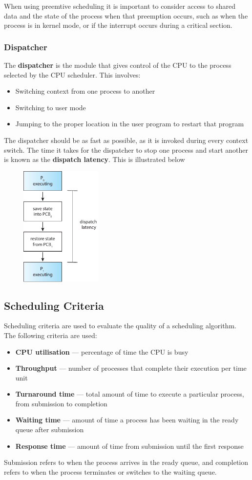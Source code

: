\documentclass{article}
\begin{document}
When using preemtive scheduling it is important to consider access to
shared data and the state of the process when that preemption occurs,
such as when the process is in kernel mode, or if the interrupt occurs
during a critical section.
\subsubsection{Dispatcher}
The \textbf{dispatcher} is the module that gives control of the CPU to
the process selected by the CPU scheduler. This involves:
\begin{itemize}
    \item Switching context from one process to another
    \item Switching to user mode
    \item Jumping to the proper location in the user program to restart
          that program
\end{itemize}
The dispatcher should be as fast as possible, as it is invoked during
every context switch. The time it takes for the dispatcher to stop one
process and start another is known as the \textbf{dispatch latency}.
This is illustrated below
\begin{figure}[H]
    \centering
    \includegraphics[height = 6cm]{figures/dispatcher.pdf}
\end{figure}
\subsection{Scheduling Criteria}
Scheduling criteria are used to evaluate the quality of a scheduling
algorithm. The following criteria are used:
\begin{itemize}
    \item \textbf{CPU utilisation} --- percentage of time the CPU is
          busy
    \item \textbf{Throughput} --- number of processes that complete
          their execution per time unit
    \item \textbf{Turnaround time} --- total amount of time to execute a
          particular process, from submission to completion
    \item \textbf{Waiting time} --- amount of time a process has been
          waiting in the ready queue after submission
    \item \textbf{Response time} --- amount of time from submission
          until the first response
\end{itemize}
Submission refers to when the process arrives in the ready queue, and
completion refers to when the process terminates or switches to the
waiting queue.
\end{document}
